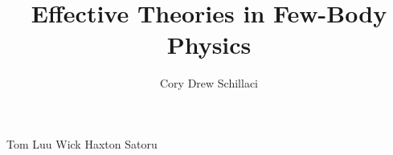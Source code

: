 \documentclass{ucbthesis}
\begin{document}

\title{Effective Theories in Few-Body Physics}
\author{Cory Drew Schillaci}


\maketitle
\approvalpage
\copyrightpage

\begin{frontmatter}



\tableofcontents
\clearpage
\listoffigures
\listoftables

\begin{acknowledgements}
Tom Luu
Wick Haxton
Satoru

\end{acknowledgements}

\end{frontmatter}

\pagestyle{headings}
\end{document}
